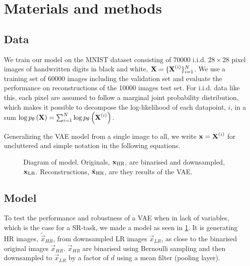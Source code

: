 \section{Materials and methods}
\label{sec:method}

\subsection{Data}
\label{sub:data}
We train our model on the MNIST dataset \cite{MNIST} consisting of 70000 i.i.d. $28 \times 28$ pixel images of handwritten digits in black and white, $\bm{\mathrm{X}} = \{\bm{\mathrm{X}}^{(i)}\}^N_{i=1}$. We use a training set of 60000 images including the validation set and evaluate the performance on reconstructions of the 10000 images test set. 
For i.i.d. data like this, each pixel are assumed to follow a marginal joint probability distribution, which makes it possible to decompose the log-likelihood of each datapoint, $i$, in a sum $\log p_{\theta}\left(\bm{\mathrm{X}}\right) = \sum^N_{i=1} \log p_{\theta}\left(\bm{\mathrm{X}}^{(i)}\right)$. 


Generalizing the VAE model from a single image to all, we write $\bm{\mathrm{x}} = \bm{\mathrm{X}}^{(i)}$ for uncluttered and simple notation in the following equations.

\begin{figure*}
	\centering
	
	\caption{Diagram of model. Originals, $\bm{\mathrm{x}}_{\text{HR}}$, are binarised and downsampled, $\bm{\mathrm{x}}_{\text{LR}}$. Reconstructions, $\tilde{\bm{\mathrm{x}}}_{\text{HR}}$, are they results of the VAE.}
	\label{fig:diagram}
\end{figure*}


\subsection{Model}
\label{sub:the_model}

To test the performance and robustness of a VAE when in lack of variables, which is the case for a SR-task, we made a model as seen in \ref{fig:diagram}. It is generating HR images, $\tilde{\vec{x}}_{HR}$, from downsampled LR images $\vec{x}_{LR}$, as close to the binarised original images $\vec{x}_{HR}$. $\vec{x}_{HR}$ are binarised using Bernoulli sampling and then downsampled to $\vec{x}_{LR}$ by a factor of $d$ using a mean filter (pooling layer).

